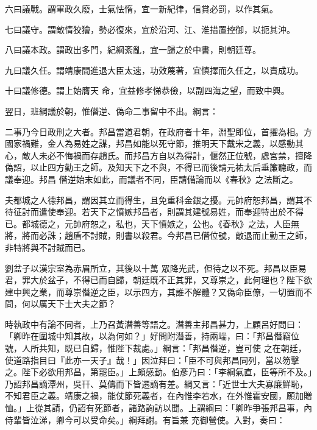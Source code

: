 \begin{pinyinscope}
 六曰議戰。謂軍政久廢，士氣怯惰，宜一新紀律，信賞必罰，以作其氣。



 七曰議守。謂敵情狡獪，勢必復來，宜於沿河、江、淮措置控御，以扼其沖。



 八曰議本政。謂政出多門，紀綱紊亂，宜一歸之於中書，則朝廷尊。



 九曰議久任。謂靖康間進退大臣太速，功效蔑著，宜慎擇而久任之，以責成功。



 十曰議修德。謂上始膺天
 命，宜益修孝悌恭儉，以副四海之望，而致中興。



 翌日，班綱議於朝，惟僭逆、偽命二事留中不出。綱言：



 二事乃今日政刑之大者。邦昌當道君朝，在政府者十年，淵聖即位，首擢為相。方國家禍難，金人為易姓之謀，邦昌如能以死守節，推明天下戴宋之義，以感動其心，敵人未必不悔禍而存趙氏。而邦昌方自以為得計，偃然正位號，處宮禁，擅降偽詔，以止四方勤王之師。及知天下之不與，不得已而後請元祐太后垂簾聽政，而議奉迎。邦昌
 僭逆始末如此，而議者不同，臣請備論而以《春秋》之法斷之。



 夫都城之人德邦昌，謂因其立而得生，且免重科金銀之擾。元帥府恕邦昌，謂其不待征討而遣使奉迎。若天下之憤嫉邦昌者，則謂其建號易姓，而奉迎特出於不得已。都城德之，元帥府恕之，私也，天下憤嫉之，公也。《春秋》之法，人臣無將，將而必誅；趙盾不討賊，則書以殺君。今邦昌已僭位號，敵退而止勤王之師，非特將與不討賊而已。



 劉盆子以漢宗室為赤眉所立，其後以十萬
 眾降光武，但待之以不死。邦昌以臣易君，罪大於盆子，不得已而自歸，朝廷既不正其罪，又尊崇之，此何理也？陛下欲建中興之業，而尊崇僭逆之臣，以示四方，其誰不解體？又偽命臣僚，一切置而不問，何以厲天下士大夫之節？



 時執政中有論不同者，上乃召黃潛善等語之。潛善主邦昌甚力，上顧呂好問曰：「卿昨在圍城中知其故，以為何如？」好問附潛善，持兩端，曰：「邦昌僭竊位號，人所共知，既已自歸，惟陛下裁處。」綱言：「邦昌僭逆，豈可使
 之在朝廷，使道路指目曰『此亦一天子』哉！」因泣拜曰：「臣不可與邦昌同列，當以笏擊之。陛下必欲用邦昌，第罷臣。」上頗感動。伯彥乃曰：「李綱氣直，臣等所不及。」乃詔邦昌謫潭州，吳幵、莫儔而下皆遷謫有差。綱又言：「近世士大夫寡廉鮮恥，不知君臣之義。靖康之禍，能仗節死義者，在內惟李若水，在外惟霍安國，願加贈恤。」上從其請，仍詔有死節者，諸路詢訪以聞。上謂綱曰：「卿昨爭張邦昌事，內侍輩皆泣涕，卿今可以受命矣。」綱拜謝。有旨兼
 充御營使。入對，奏曰：




\end{pinyinscope}
